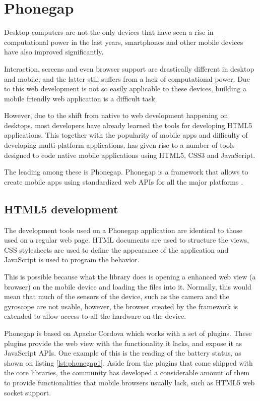 \section{Phonegap}\label{sec:phonegap}

Desktop computers are not the only devices that have seen a rise in computational power in the last years, smartphones and other mobile devices have also improved significantly. 

Interaction, screens and even browser support are drastically different in desktop and mobile; and the latter still suffers from a lack of computational power. Due to this web development is not so easily applicable to these devices, building a mobile friendly web application is a difficult task.

However, due to the shift from native to web development happening on desktops, most developers have already learned the tools for developing HTML5 applications. This together with the popularity of mobile apps and difficulty of developing multi-platform applications, has given rise to a number of tools designed to code native mobile applications using HTML5, CSS3 and JavaScript.

The leading among these is Phonegap. Phonegap is a framework that allows to create mobile apps using standardized web APIs for all the major platforms \cite{phonegap}. 

\subsection*{HTML5 development}

The development tools used on a Phonegap application are identical to those used on a regular web page. HTML documents are used to structure the views, CSS stylesheets are used to define the appearance of the application and JavaScript is used to program the behavior.

This is possible because what the library does is opening a enhanced web view (a browser) on the mobile device and loading the files into it. Normally, this would mean that much of the sensors of the device, such as the camera and the gyroscope are not usable, however, the browser created by the framework is extended to allow access to all the hardware on the device.

Phonegap is based on Apache Cordova\cite{apachecordova} which works with a set of plugins. These plugins provide the web view with the functionality it lacks, and expose it as JavaScript APIs. One example of this is the reading of the battery status, as shown on listing \ref{lst:phonegap1}. Aside from the plugins that come shipped with the core libraries, the community has developed a considerable amount of them to provide functionalities that mobile browsers usually lack, such as HTML5 web socket support.

